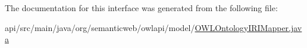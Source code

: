 The documentation for this interface was generated from the following file\-:\begin{DoxyCompactItemize}
\item 
api/src/main/java/org/semanticweb/owlapi/model/\hyperlink{_o_w_l_ontology_i_r_i_mapper_8java}{O\-W\-L\-Ontology\-I\-R\-I\-Mapper.\-java}\end{DoxyCompactItemize}

